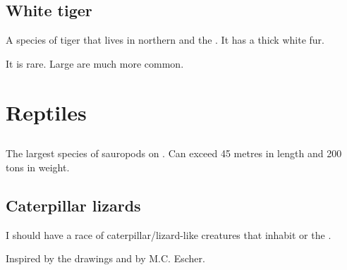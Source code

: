 \subsection{White tiger}
A species of tiger that lives in northern  and the . 
It has a thick white fur. 

It is rare. 
Large \saurians{} are much more common. 















\section{Reptiles}









\subsection{\Brukath}
\index{\brukath}
The largest species of sauropods on \Miith. 
Can exceed 45 metres in length and 200 tons in weight. 













\subsection{Caterpillar lizards}
I should have a race of caterpillar/lizard-like creatures that inhabit  or the . 

Inspired by the drawings  and  by M.C. Escher. 

